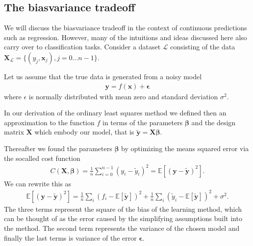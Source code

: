 \documentclass[letterpaper,10pt,english]{sphinxmanual}
\begin{document}
\subsection{The bias\sphinxhyphen{}variance tradeoff}
\label{\detokenize{chapter4:the-bias-variance-tradeoff}}
We will discuss the bias\sphinxhyphen{}variance tradeoff in the context of
continuous predictions such as regression. However, many of the
intuitions and ideas discussed here also carry over to classification
tasks. Consider a dataset \(\mathcal{L}\) consisting of the data
\(\mathbf{X}_\mathcal{L}=\{(y_j, \boldsymbol{x}_j), j=0\ldots n-1\}\).

Let us assume that the true data is generated from a noisy model
\begin{equation*}
\begin{split}
\boldsymbol{y}=f(\boldsymbol{x}) + \boldsymbol{\epsilon}
\end{split}
\end{equation*}
where \(\epsilon\) is normally distributed with mean zero and standard deviation \(\sigma^2\).

In our derivation of the ordinary least squares method we defined then
an approximation to the function \(f\) in terms of the parameters
\(\boldsymbol{\beta}\) and the design matrix \(\boldsymbol{X}\) which embody our model,
that is \(\boldsymbol{\tilde{y}}=\boldsymbol{X}\boldsymbol{\beta}\).

Thereafter we found the parameters \(\boldsymbol{\beta}\) by optimizing the means squared error via the so\sphinxhyphen{}called cost function
\begin{equation*}
\begin{split}
C(\boldsymbol{X},\boldsymbol{\beta}) =\frac{1}{n}\sum_{i=0}^{n-1}(y_i-\tilde{y}_i)^2=\mathbb{E}\left[(\boldsymbol{y}-\boldsymbol{\tilde{y}})^2\right].
\end{split}
\end{equation*}
We can rewrite this as
\begin{equation*}
\begin{split}
\mathbb{E}\left[(\boldsymbol{y}-\boldsymbol{\tilde{y}})^2\right]=\frac{1}{n}\sum_i(f_i-\mathbb{E}\left[\boldsymbol{\tilde{y}}\right])^2+\frac{1}{n}\sum_i(\tilde{y}_i-\mathbb{E}\left[\boldsymbol{\tilde{y}}\right])^2+\sigma^2.
\end{split}
\end{equation*}
The three terms represent the square of the bias of the learning
method, which can be thought of as the error caused by the simplifying
assumptions built into the method. The second term represents the
variance of the chosen model and finally the last terms is variance of
the error \(\boldsymbol{\epsilon}\).
\end{document}
